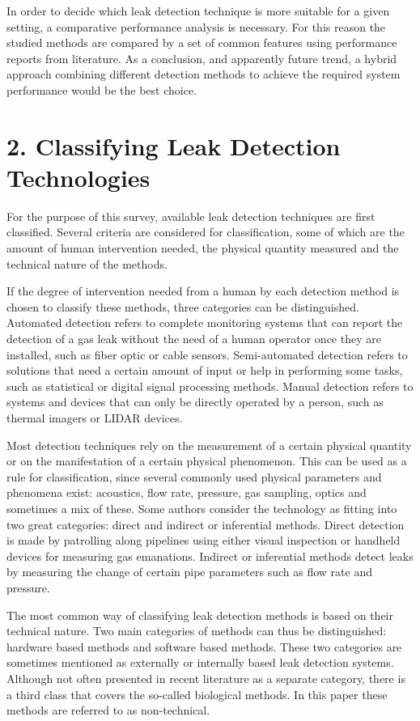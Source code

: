 In order to decide which leak detection technique is more suitable for a given setting, a comparative performance analysis is necessary. For this reason the studied methods are compared by a set of common features using performance reports from literature. As a conclusion, and apparently future trend, a hybrid approach combining different detection methods to achieve the required system performance would be the best choice.

\section*{2. Classifying Leak Detection Technologies}

For the purpose of this survey, available leak detection techniques are first classified. Several criteria are considered for classification, some of which are the amount of human intervention needed, the physical quantity measured and the technical nature of the methods.

If the degree of intervention needed from a human by each detection method is chosen to classify these methods, three categories can be distinguished. Automated detection refers to complete monitoring systems that can report the detection of a gas leak without the need of a human operator once they are installed, such as fiber optic or cable sensors. Semi-automated detection refers to solutions that need a certain amount of input or help in performing some tasks, such as statistical or digital signal processing methods. Manual detection refers to systems and devices that can only be directly operated by a person, such as thermal imagers or LIDAR devices.

Most detection techniques rely on the measurement of a certain physical quantity or on the manifestation of a certain physical phenomenon. This can be used as a rule for classification, since several commonly used physical parameters and phenomena exist: acoustics, flow rate, pressure, gas sampling, optics and sometimes a mix of these. Some authors consider the technology as fitting into two great categories: direct and indirect or inferential methods. Direct detection is made by patrolling along pipelines using either visual inspection or handheld devices for measuring gas emanations. Indirect or inferential methods detect leaks by measuring the change of certain pipe parameters such as flow rate and pressure.

The most common way of classifying leak detection methods is based on their technical nature. Two main categories of methods can thus be distinguished: hardware based methods and software based methods. These two categories are sometimes mentioned as externally or internally based leak detection systems. Although not often presented in recent literature as a separate category, there is a third class that covers the so-called biological methods. In this paper these methods are referred to as non-technical.

